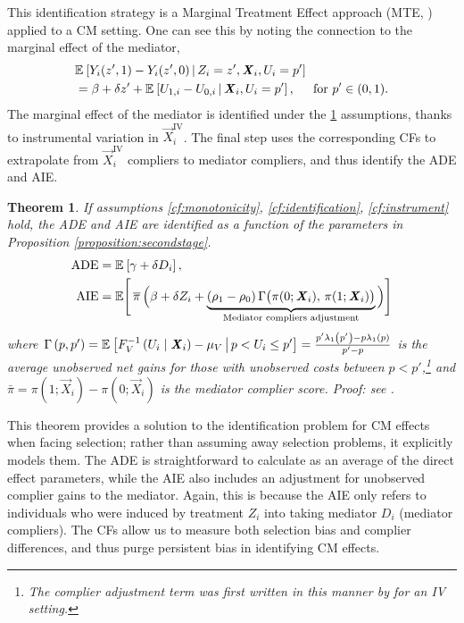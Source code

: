 This identification strategy is a Marginal Treatment Effect approach (MTE, \citealt{bjorklund1987estimation,heckman2005structural}) applied to a CM setting.
One can see this by noting the connection to the marginal effect of the mediator,
\begin{align*}
    & \mathbb{E}_{} \left[ Y_i(z', 1) - Y_i(z', 0) \, \middle\vert \, Z_i = z', \boldsymbol{\mathit{X}}_i, U_i = p' \right] \\
    &= \beta + \delta z' + \mathbb{E}_{} \left[ U_{1,i} - U_{0,i} \, \middle\vert \, \boldsymbol{\mathit{X}}_i, U_i = p' \right],
    \;\;\;\; \text{ for } p' \in (0,1).
\end{align*}
The marginal effect of the mediator is identified under the \ref{thm:cf-identification} assumptions, thanks to instrumental variation in $\vec X_i^{\text{IV}}$.
The final step uses the corresponding CFs to extrapolate from $\vec X_i^{\text{IV}}$ compliers to mediator compliers, and thus identify the ADE and AIE.

\newtheorem{theoremCF}{Theorem}
\renewcommand\thetheoremCF{CF}
\begin{theoremCF}
    \label{thm:cf-identification}
    If assumptions \ref{cf:monotonicity}, \ref{cf:identification}, \ref{cf:instrument} hold, the ADE and AIE are identified as a function of the parameters in Proposition \ref{proposition:secondstage}.
    \begin{align*}
    \text{ADE}
        &= \mathbb{E}_{} \left[ \gamma + \delta D_i \right], \\
    \text{AIE}
        &= \mathbb E \Bigg[ \, \overline{\pi} \,
            \Big( \beta +  \delta Z_i +
                \underbrace{ (\rho_1 - \rho_0) \,
                \Gamma \big(\pi(0; \boldsymbol{\mathit{X}}_i), \, \pi(1; \boldsymbol{\mathit{X}}_i) \big)}_{
                    \text{Mediator compliers adjustment}} \Big) \Bigg]
    \end{align*}
    where $\Gamma\left(p,p'\right) 
    = \mathbb{E}_{} \left[  F_V^{-1}\left( U_i \mid \boldsymbol{\mathit{X}}_i \right) - \mu_V \, \middle\vert \, p < U_i \leq p' \right]
    = \frac{p'\lambda_1\left(p'\right) - p\lambda_1\left(p\right)}{p' - p}$ is the average unobserved net gains for those with unobserved costs between $p < p'$,\footnote{
        The complier adjustment term was first written in this manner by \cite{kline2019heckits} for an IV setting.
    } and $\bar\pi = \pi(1; \vec X_i) - \pi(0; \vec X_i)$ is the mediator complier score.
    Proof: see .
\end{theoremCF}

This theorem provides a solution to the identification problem for CM effects when facing selection;
rather than assuming away selection problems, it explicitly models them.
The ADE is straightforward to calculate as an average of the direct effect parameters, while the AIE also includes an adjustment for unobserved complier gains to the mediator.
Again, this is because the AIE only refers to individuals who were induced by treatment $Z_i$ into taking mediator $D_i$ (mediator compliers).
The CFs allow us to measure both selection bias and complier differences, and thus purge persistent bias in identifying CM effects.

